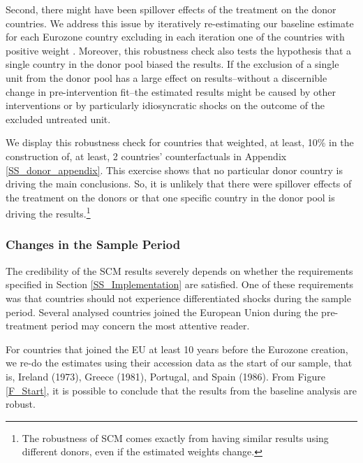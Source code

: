 \documentclass[12pt]{article}
\begin{document}
Second, there might have been spillover effects of the treatment on the donor countries. We address this issue by iteratively re-estimating our baseline estimate for each Eurozone country excluding in each iteration one of the countries with positive weight \citep{Abadie2015}. Moreover, this robustness check also tests the hypothesis that a single country in the donor pool biased the results. If the exclusion of a single unit from the donor pool has a large effect on results--without a discernible change in pre-intervention fit--the estimated results might be caused by other interventions or by particularly idiosyncratic shocks on the outcome of the excluded untreated unit.

We display this robustness check for countries that weighted, at least, 10\% in the construction of, at least, 2 countries' counterfactuals in Appendix \ref{SS_donor_appendix}. This exercise shows that no particular donor country is driving the main conclusions. So, it is unlikely that there were spillover effects of the treatment on the donors or that one specific country in the donor pool is driving the results.\footnote{The robustness of SCM comes exactly from having similar results using different donors, even if the estimated weights change.}

\subsubsection{Changes in the Sample Period \label{SS_start}}

The credibility of the SCM results severely depends on whether the requirements specified in Section \ref{SS_Implementation} are satisfied. One of these requirements was that countries should not experience differentiated shocks during the sample period. Several analysed countries joined the European Union during the pre-treatment period may concern the most attentive reader. 

For countries that joined the EU at least 10 years before the Eurozone creation, we re-do the estimates using their accession data as the start of our sample, that is, Ireland (1973), Greece (1981), Portugal, and Spain (1986). From Figure \ref{F_Start}, it is possible to conclude that the results from the baseline analysis are robust.
\end{document}

